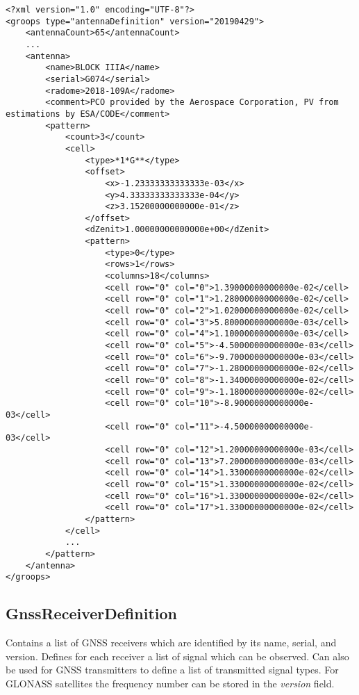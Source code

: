 \begin{verbatim}
<?xml version="1.0" encoding="UTF-8"?>
<groops type="antennaDefinition" version="20190429">
    <antennaCount>65</antennaCount>
    ...
    <antenna>
        <name>BLOCK IIIA</name>
        <serial>G074</serial>
        <radome>2018-109A</radome>
        <comment>PCO provided by the Aerospace Corporation, PV from estimations by ESA/CODE</comment>
        <pattern>
            <count>3</count>
            <cell>
                <type>*1*G**</type>
                <offset>
                    <x>-1.23333333333333e-03</x>
                    <y>4.33333333333333e-04</y>
                    <z>3.15200000000000e-01</z>
                </offset>
                <dZenit>1.00000000000000e+00</dZenit>
                <pattern>
                    <type>0</type>
                    <rows>1</rows>
                    <columns>18</columns>
                    <cell row="0" col="0">1.39000000000000e-02</cell>
                    <cell row="0" col="1">1.28000000000000e-02</cell>
                    <cell row="0" col="2">1.02000000000000e-02</cell>
                    <cell row="0" col="3">5.80000000000000e-03</cell>
                    <cell row="0" col="4">1.10000000000000e-03</cell>
                    <cell row="0" col="5">-4.50000000000000e-03</cell>
                    <cell row="0" col="6">-9.70000000000000e-03</cell>
                    <cell row="0" col="7">-1.28000000000000e-02</cell>
                    <cell row="0" col="8">-1.34000000000000e-02</cell>
                    <cell row="0" col="9">-1.18000000000000e-02</cell>
                    <cell row="0" col="10">-8.90000000000000e-03</cell>
                    <cell row="0" col="11">-4.50000000000000e-03</cell>
                    <cell row="0" col="12">1.20000000000000e-03</cell>
                    <cell row="0" col="13">7.20000000000000e-03</cell>
                    <cell row="0" col="14">1.33000000000000e-02</cell>
                    <cell row="0" col="15">1.33000000000000e-02</cell>
                    <cell row="0" col="16">1.33000000000000e-02</cell>
                    <cell row="0" col="17">1.33000000000000e-02</cell>
                </pattern>
            </cell>
            ...
        </pattern>
    </antenna>
</groops>
\end{verbatim}


\subsection{GnssReceiverDefinition}\label{general.fileFormat:gnssReceiverDefinition}
Contains a list of GNSS receivers which are identified by its
name, serial, and version. Defines for each receiver a list of
signal  which can be observed.
Can also be used for GNSS transmitters to define a list of
transmitted signal types. For GLONASS satellites the frequency
number can be stored in the \emph{version} field.

